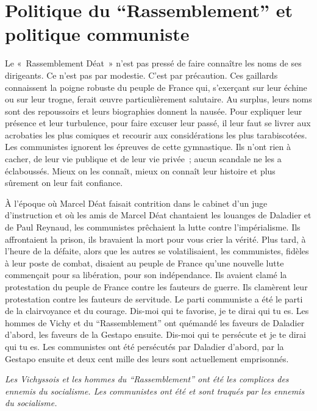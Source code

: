 \documentclass[french,twoside]{book} %
\begin{document}
\section[Politique du “Rassemblement” et politique communiste]{Politique du “Rassemblement” et politique communiste}
\noindent Le « Rassemblement Déat » n’est pas pressé de faire connaître les noms de ses dirigeants. Ce n’est pas par modestie. C’est par précaution. Ces gaillards connaissent la poigne robuste du peuple de France qui, s’exerçant sur leur échine ou sur leur trogne, ferait œuvre particulièrement salutaire. Au surplus, leurs noms sont des repoussoirs et leurs biographies donnent la nausée. Pour expliquer leur présence et leur turbulence, pour faire excuser leur passé, il leur faut se livrer aux acrobaties les plus comiques et recourir aux considérations les plus tarabiscotées. Les communistes ignorent les épreuves de cette gymnastique. Ils n’ont rien à cacher, de leur vie publique et de leur vie privée ; aucun scandale ne les a éclaboussés. Mieux on les connaît, mieux on connaît leur histoire et plus sûrement on leur fait confiance.\par
À l’époque où Marcel Déat faisait contrition dans le cabinet d’un juge d’instruction et où les amis de Marcel Déat chantaient les louanges de Daladier et de Paul Reynaud, les communistes prêchaient la lutte contre l’impérialisme. Ils affrontaient la prison, ils bravaient la mort pour vous crier la vérité. Plus tard, à l’heure de la défaite, alors que les autres se volatilisaient, les communistes, fidèles à leur poste de combat, disaient au peuple de France qu’une nouvelle lutte commençait pour sa libération, pour son indépendance. Ils avaient clamé la protestation du peuple de France contre les fauteurs de guerre. Ils clamèrent leur protestation contre les fauteurs de servitude. Le parti communiste a été le parti de la clairvoyance et du courage. Dis-moi qui te favorise, je te dirai qui tu es. Les hommes de Vichy et du “Rassemblement” ont quémandé les faveurs de Daladier d’abord, les faveurs de la Gestapo ensuite. Dis-moi qui te persécute et je te dirai qui tu es. Les communistes ont été persécutés par Daladier d’abord, par la Gestapo ensuite et deux cent mille des leurs sont actuellement emprisonnés.\par
{\itshape Les Vichyssois et les hommes du “Rassemblement” ont été les complices des ennemis du socialisme. Les communistes ont été et sont traqués par les ennemis du socialisme.}\par
\end{document}
